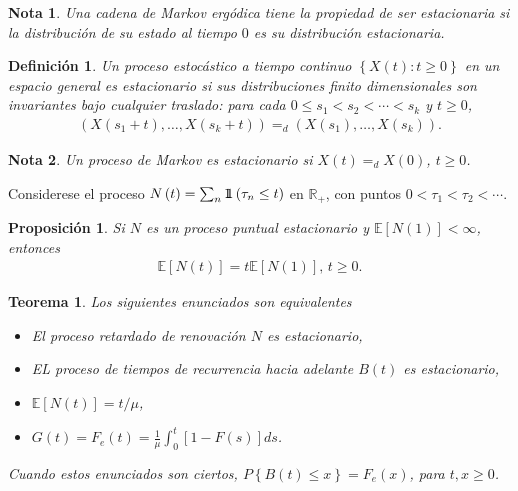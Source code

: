 \documentclass{article}
\newtheorem{Def}{Definición}[section]
\newtheorem{Teo}{Teorema}%
\newtheorem{Note}{Nota}%
\newtheorem{Prop}{Proposición}%
\newcommand{\rea}{\mathbb{R}}
\newcommand{\esp}{\mathbb{E}}
\newcommand{\indora}{\mbox{$1$\hspace{-0.8ex}$1$}}
\numberwithin{equation}{section}
\begin{document}
\begin{Note}
Una cadena de Markov erg\'odica tiene la propiedad de ser estacionaria si la distribuci\'on de su estado al tiempo $0$ es su distribuci\'on estacionaria.
\end{Note}

\begin{Def}
Un proceso estoc\'astico a tiempo continuo $\left\{X\left(t\right):t\geq0\right\}$ en un espacio general es estacionario si sus distribuciones finito dimensionales son invariantes bajo cualquier  traslado: para cada $0\leq s_{1}<s_{2}<\cdots<s_{k}$ y $t\geq0$,
\begin{eqnarray*}
\left(X\left(s_{1}+t\right),\ldots,X\left(s_{k}+t\right)\right)=_{d}\left(X\left(s_{1}\right),\ldots,X\left(s_{k}\right)\right).
\end{eqnarray*}
\end{Def}

\begin{Note}
Un proceso de Markov es estacionario si $X\left(t\right)=_{d}X\left(0\right)$, $t\geq0$.
\end{Note}

Considerese el proceso $N\left(t\right)=\sum_{n}\indora\left(\tau_{n}\leq t\right)$ en $\rea_{+}$, con puntos $0<\tau_{1}<\tau_{2}<\cdots$.

\begin{Prop}
Si $N$ es un proceso puntual estacionario y $\esp\left[N\left(1\right)\right]<\infty$, entonces 
\begin{eqnarray}
\esp\left[N\left(t\right)\right]=t\esp\left[N\left(1\right)\right]\textrm{, }t\geq0.
\end{eqnarray}
\end{Prop}

\begin{Teo}
Los siguientes enunciados son equivalentes
\begin{itemize}
\item[i)] El proceso retardado de renovaci\'on $N$ es estacionario,
\item[ii)] EL proceso de tiempos de recurrencia hacia adelante $B\left(t\right)$ es estacionario,
\item[iii)] $\esp\left[N\left(t\right)\right]=t/\mu$,
\item[iv)] $G\left(t\right)=F_{e}\left(t\right)=\frac{1}{\mu}\int_{0}^{t}\left[1-F\left(s\right)\right]ds$.
\end{itemize}
Cuando estos enunciados son ciertos, $P\left\{B\left(t\right)\leq x\right\}=F_{e}\left(x\right)$, para $t,x\geq0$.
\end{Teo}
\end{document}
